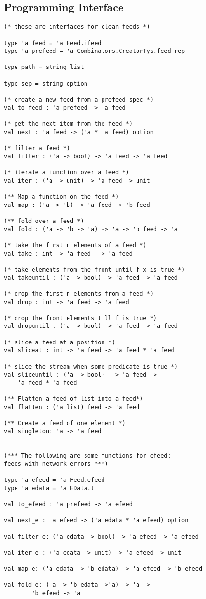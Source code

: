 \subsection{Programming Interface}
{\small 
\begin{verbatim}
(* these are interfaces for clean feeds *)

type 'a feed = 'a Feed.ifeed
type 'a prefeed = 'a Combinators.CreatorTys.feed_rep

type path = string list

type sep = string option

(* create a new feed from a prefeed spec *)
val to_feed : 'a prefeed -> 'a feed

(* get the next item from the feed *)
val next : 'a feed -> ('a * 'a feed) option

(* filter a feed *)
val filter : ('a -> bool) -> 'a feed -> 'a feed

(* iterate a function over a feed *)
val iter : ('a -> unit) -> 'a feed -> unit

(** Map a function on the feed *)
val map : ('a -> 'b) -> 'a feed -> 'b feed

(** fold over a feed *)
val fold : ('a -> 'b -> 'a) -> 'a -> 'b feed -> 'a

(* take the first n elements of a feed *)
val take : int -> 'a feed  -> 'a feed

(* take elements from the front until f x is true *)
val takeuntil : ('a -> bool) -> 'a feed -> 'a feed

(* drop the first n elements from a feed *)
val drop : int -> 'a feed -> 'a feed

(* drop the front elements till f is true *)
val dropuntil : ('a -> bool) -> 'a feed -> 'a feed 

(* slice a feed at a position *)
val sliceat : int -> 'a feed -> 'a feed * 'a feed

(* slice the stream when some predicate is true *)
val sliceuntil : ('a -> bool)  -> 'a feed -> 
	'a feed * 'a feed

(** Flatten a feed of list into a feed*)
val flatten : ('a list) feed -> 'a feed

(** Create a feed of one element *)
val singleton: 'a -> 'a feed


(*** The following are some functions for efeed: 
feeds with network errors ***)

type 'a efeed = 'a Feed.efeed
type 'a edata = 'a EData.t

val to_efeed : 'a prefeed -> 'a efeed

val next_e : 'a efeed -> ('a edata * 'a efeed) option

val filter_e: ('a edata -> bool) -> 'a efeed -> 'a efeed

val iter_e : ('a edata -> unit) -> 'a efeed -> unit

val map_e: ('a edata -> 'b edata) -> 'a efeed -> 'b efeed

val fold_e: ('a -> 'b edata ->'a) -> 'a -> 
		'b efeed -> 'a
\end{verbatim}
}

